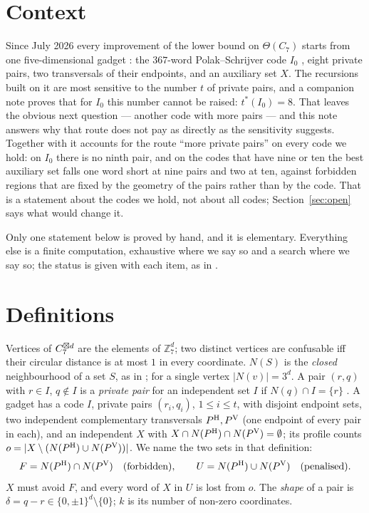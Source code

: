 \section{Context}
\label{sec:intro}

Since July 2026 every improvement of the lower bound on $\Theta(C_7)$
\cite{itty2026,gao2026,bpz2026,tandon2026} starts from one five-dimensional gadget
\cite{gao2026}: the $367$-word Polak--Schrijver code $I_0$ \cite{polak2019}, eight private
pairs, two transversals of their endpoints, and an auxiliary set $X$. The recursions built on
it are most sensitive to the number $t$ of private pairs, and a companion note
\cite{oktiabrev2026a} proves that for $I_0$ this number cannot be raised: $t^*(I_0)=8$. That
leaves the obvious next question --- another code with more pairs --- and this note answers why
that route does not pay as directly as the sensitivity suggests. Together with
\cite{oktiabrev2026a} it accounts for the route ``more private pairs'' on every code we hold:
on $I_0$ there is no ninth pair, and on the codes that have nine or ten the best auxiliary set
falls one word short at nine pairs and two at ten, against forbidden regions that are fixed by
the geometry of the pairs rather than by the code. That is a statement about
the codes we hold, not about all codes; Section~\ref{sec:open} says what would change it.

Only one statement below is proved by hand, and it is elementary. Everything else is a finite
computation, exhaustive where we say so and a search where we say so; the status is given with
each item, as in \cite{oktiabrev2026a}.

\section{Definitions}
\label{sec:defs}

Vertices of $C_7^{\boxtimes d}$ are the elements of $\mathbb{Z}_7^d$; two distinct vertices are
confusable iff their circular distance is at most $1$ in every coordinate. $N(S)$ is the
\emph{closed} neighbourhood of a set $S$, as in \cite{gao2026,tandon2026}; for a single
vertex $|N(v)|=3^d$. A pair $(r,q)$ with $r\in I$, $q\notin I$ is a \emph{private pair} for an
independent set $I$ if $N(q)\cap I=\{r\}$ \cite{gao2026,tandon2026}. A gadget
\cite{gao2026} has a code $I$, private pairs $(r_i,q_i)$, $1\le i\le t$, with disjoint
endpoint sets, two independent complementary transversals $P^{\mathrm H},P^{\mathrm V}$ (one endpoint of every
pair in each), and an independent $X$ with $X\cap N(P^{\mathrm H})\cap N(P^{\mathrm V})=\emptyset$; its profile
counts $o=|X\setminus(N(P^{\mathrm H})\cup N(P^{\mathrm V}))|$. We name the two sets in that definition:
\[
  F=N(P^{\mathrm H})\cap N(P^{\mathrm V})\quad\text{(forbidden)},\qquad
  U=N(P^{\mathrm H})\cup N(P^{\mathrm V})\quad\text{(penalised)}.
\]
$X$ must avoid $F$, and every word of $X$ in $U$ is lost from $o$. The \emph{shape} of a pair is
$\delta=q-r\in\{0,\pm1\}^d\setminus\{0\}$; $k$ is its number of non-zero coordinates.

